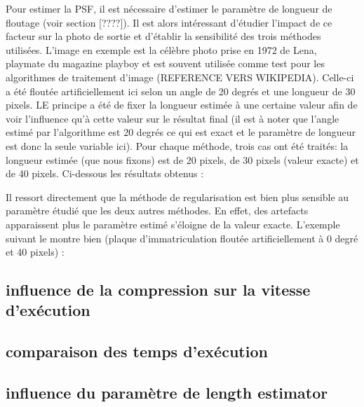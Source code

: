 Pour estimer la PSF, il est nécessaire d'estimer le paramètre de longueur de floutage (voir section [????]). Il est alors intéressant d'étudier l'impact de ce facteur sur la photo de sortie et d'établir la sensibilité des trois méthodes utilisées. 
L'image en exemple est la célèbre photo prise en 1972 de Lena, playmate du magazine playboy et est souvent utilisée comme test pour les algorithmes de traitement d'image (REFERENCE VERS WIKIPEDIA). Celle-ci a été floutée artificiellement ici selon un angle de 20 degrés et une longueur de 30 pixels. LE principe a été de fixer la longueur estimée à une certaine valeur afin de voir l'influence qu'à cette valeur sur le résultat final (il est à noter que l'angle estimé par l'algorithme est 20 degrés ce qui est exact et le paramètre de longueur est donc la seule variable ici). Pour chaque méthode, trois cas ont été traités: la longueur estimée (que nous fixons) est de 20 pixels, de 30 pixels (valeur exacte) et de 40 pixels. Ci-dessous les résultats obtenus : 


Il ressort directement que la méthode de regularisation est bien plus sensible au paramètre étudié que les deux autres méthodes. En effet, des artefacts apparaissent plus le paramètre estimé s'éloigne de la valeur exacte. L'exemple suivant le montre bien (plaque d'immatriculation floutée artificiellement à 0 degré et 40 pixels) : 



\subsection{influence de la compression sur la vitesse d'exécution}

\subsection{comparaison des temps d'exécution}

\subsection{influence du paramètre de length estimator}

